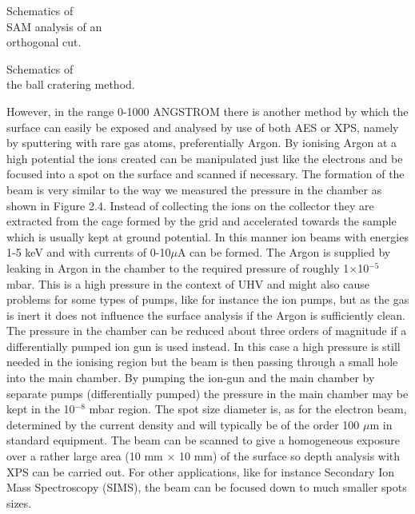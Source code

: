   Schematics of\\ SAM analysis of
 an\\ orthogonal cut.\\

 \vspace{6cm}

  Schematics of \\ the ball
 cratering method.\\

 \vspace{6cm}

 However, in the range 0-1000 ANGSTROM there is another method by
 which the surface can easily be exposed and analysed by use
 of both AES or XPS, namely by sputtering with rare gas
 atoms, preferentially Argon. By ionising Argon at a high
 potential the ions created can be manipulated just like the
 electrons and be focused into a spot on the surface and
 scanned if necessary. The formation of the beam is very
 similar to the way we measured the pressure in the chamber
 as shown in Figure 2.4. Instead of collecting the ions on
 the collector they are extracted from the cage formed by the
 grid and accelerated towards the sample which is usually
 kept at ground potential. In this manner ion beams with
 energies 1-5 keV and with currents of 0-10$\mu$A can be
 formed. The Argon is supplied by leaking in Argon in the
 chamber to the required pressure of roughly
 1$\times$10$^{-5}$ mbar. This is a high pressure in the
 context of UHV and might also cause problems for some types
 of pumps, like for instance the ion pumps, but as the gas is
 inert it does not influence the surface analysis if the
 Argon is sufficiently clean. The pressure in the chamber can
 be reduced about three orders of magnitude if a
 differentially pumped ion gun is used instead. In this case
 a high pressure is still needed in the ionising region but
 the beam is then passing through a small hole into the main
 chamber. By pumping the ion-gun and the main chamber by
 separate pumps (differentially pumped) the pressure in the
 main chamber may be kept in the 10$^{-8}$ mbar region. The
 spot size diameter is, as for the electron beam, determined
 by the current density and will typically be of the order
 100 $\mu$m in standard equipment. The beam can be scanned
 to give a homogeneous exposure over a rather large area (10
 mm $\times$ 10 mm) of the surface so depth analysis with XPS
 can be carried out. For other applications, like for
 instance Secondary Ion Mass Spectroscopy (SIMS), the beam
 can be focused down to much smaller spots sizes. 




